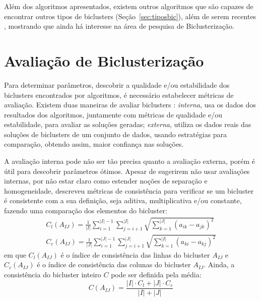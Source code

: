 \documentclass[
    12pt,                %
    oneside,            %
    a4paper,            %
    english,            %
    brazil                %
    ]{abntex2ppgsi}
\begin{document}


Além dos algoritmos apresentados, existem outros algoritmos que são capazes de encontrar outros tipos de biclusters (Seção~\ref{sec:tiposbic}), além de serem recentes \cite{Franca20102,Yang2013,Hochreiter2010,Cabanes2012}, mostrando que ainda há interesse na área de pesquisa de Biclusterização.

 \section{Avaliação de Biclusterização}

Para determinar parâmetros, descobrir a qualidade e/ou estabilidade dos biclusters encontrados por algoritmos, é necessário estabelecer métricas de avaliação. Existem duas maneiras de avaliar biclusters \cite{Hochreiter2010}: \textit{interna}, usa os dados dos resultados dos algoritmos, juntamente com métricas de qualidade e/ou estabilidade, para avaliar as soluções geradas; \textit{externa}, utiliza os dados reais das soluções de biclusters de um conjunto de dados, usando estratégias para comparação, obtendo assim, maior confiança nas soluções.

A avaliação interna pode não ser tão precisa quanto a avaliação externa, porém é útil para descobrir parâmetros ótimos. Apesar de  sugerirem não usar avaliações internas, por não estar claro como estender noções de separação e homogeneidade,  descreveu métricas de consistência para verificar se um bicluster é consistente com a sua definição, seja aditiva, multiplicativa e/ou constante, fazendo uma comparação dos elementos do bicluster:
\begin{equation}
\begin{split}
C_l(A_{IJ}) = \frac{1}{|I|} \displaystyle\sum_{i = 1}^{|I| - 1} \displaystyle\sum_{j = i + 1}^{|I|} \sqrt{ \displaystyle\sum_{k = 1}^{|J|} (a_{ik} - a_{jk})^2 } \\
C_c(A_{IJ}) = \frac{1}{|J|} \displaystyle\sum_{i = 1}^{|J| - 1} \displaystyle\sum_{j = i + 1}^{|J|} \sqrt{ \displaystyle\sum_{k = 1}^{|I|} (a_{ki} - a_{kj})^2 }
\end{split}
\end{equation}
em que $C_l(A_{IJ})$ é o índice de consistência das linhas do bicluster $A_{IJ}$ e $C_c(A_{IJ})$ é o índice de consistência das colunas do bicluster $A_{IJ}$. Ainda, a consistência do bicluster inteiro $C$ pode ser definida pela média:
\begin{equation}
C(A_{IJ}) = \frac{|I| \cdot C_l + |J| \cdot C_c}{|I| + |J|}
\end{equation}
\end{document}
